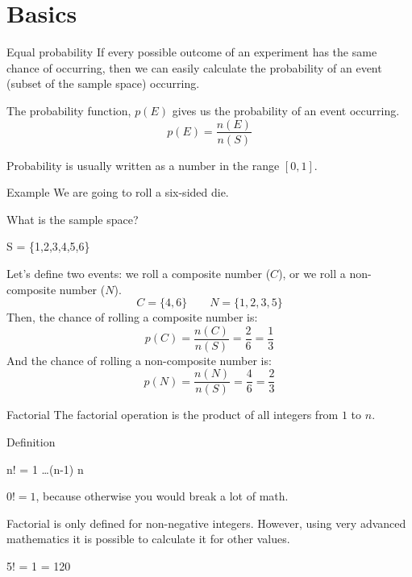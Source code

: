 	\section{Basics}
	\begin{namedframe}{Equal probability}
		If every possible outcome of an experiment has the same chance of occurring, then we can easily calculate the probability of an event (subset of the sample space) occurring.

		The probability function, $p(E)$ gives us the probability of an event occurring.
		\[p(E) = \frac{n(E)}{n(S)}\]

		Probability is usually written as a number in the range $[0,1]$.
	\end{namedframe}
	\begin{namedframe}{Example}
		We are going to roll a six-sided die.
		\begin{exampleblock}{What is the sample space?}
			\pause
			\begin{compactmath}
				S = \{1,2,3,4,5,6\}
			\end{compactmath}
		\end{exampleblock}
		\pause
		Let's define two events: we roll a composite number ($C$), or we roll a non-composite number ($N$).
		\[C = \{4,6\} \qquad N = \{1,2,3,5\}\]
		\pause
		Then, the chance of rolling a composite number is:
		\[p(C) = \frac{n(C)}{n(S)} = \frac{2}{6} = \frac{1}{3}\]
		\pause
		And the chance of rolling a non-composite number is:
		\pause
		\[p(N) = \frac{n(N)}{n(S)} = \frac{4}{6} = \frac{2}{3}\]
	\end{namedframe}
	\begin{namedframe}{Factorial}
		The factorial operation is the product of all integers from $1$ to $n$.
		\pause
		\begin{block}{Definition}
			\begin{compactmath}[\Large]
				n! = 1  \times \dots \times (n-1) \times n
			\end{compactmath}

			$0! = 1$, because otherwise you would break a lot of math.

			\scriptsize
			Factorial is only defined for non-negative integers. However, using very advanced mathematics it is possible to calculate it for other values.
		\end{block}
		\pause
		\begin{example}
			\begin{compactmath}[\large]
				5! = 1    \times 5 = 120
			\end{compactmath}
		\end{example}
	\end{namedframe}
